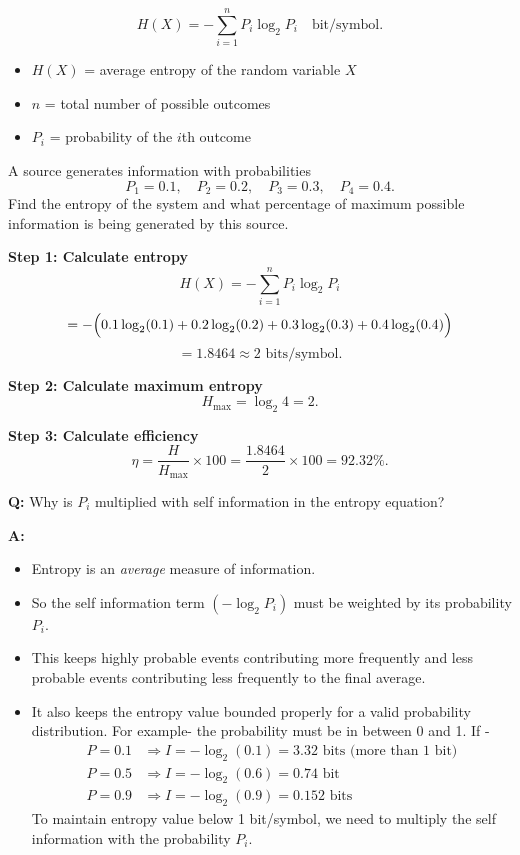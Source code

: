 \documentclass[11pt,a4paper]{book}
\newenvironment{formulabox}[1][Formula]{%
    \begin{tcolorbox}[
        enhanced,
        breakable,
        colback=softcoral!10,
        colframe=softcoral!200,
        title=#1,
        fonttitle=\bfseries,
        coltitle=white,
        sharp corners,
        boxrule=1pt,
        left=8pt,
        right=8pt,
        top=6pt,
        bottom=6pt
    ]
}{\end{tcolorbox}}
\newcounter{qna}[chapter]
\renewcommand{\theqna}{\thechapter.\arabic{qna}}
\newenvironment{questionanswerbox}[1][Example]{%
    \refstepcounter{qna}
    \begin{tcolorbox}[
        enhanced,
        breakable,
        colback=softlavender!10,
        colframe=softlavender!200,
        title={#1~\theqna},
        fonttitle=\bfseries,
        coltitle=white,
        colbacktitle=softlavender!200,
        sharp corners,
        boxrule=1pt,
        left=8pt,
        right=8pt,
        top=6pt,
        bottom=6pt
    ]
}{\end{tcolorbox}}
\begin{document}
\begin{formulabox}[Entropy of a Random Variable]
\[
H(X) = -\sum_{i=1}^{n} P_i \log_2 P_i
\quad \text{bit/symbol.}
\]
\begin{itemize}
    \item $H(X)$ = average entropy of the random variable $X$
    \item $n$ = total number of possible outcomes
    \item $P_i$ = probability of the $i$th outcome
\end{itemize}
\end{formulabox}

\begin{questionanswerbox}[Example]
A source generates information with probabilities
\[
P_1 = 0.1,\quad P_2 = 0.2,\quad P_3 = 0.3,\quad P_4 = 0.4.
\]
Find the entropy of the system and what percentage of maximum possible information is being generated by this source.

\textbf{Step 1: Calculate entropy}
\[
H(X) = -\sum_{i=1}^{n} P_i \log_2 P_i
\]
\[
= -\Bigl(0.1\log_2(0.1) + 0.2\log_2(0.2) + 0.3\log_2(0.3) + 0.4\log_2(0.4)\Bigr)
\]
\[
= 1.8464 \approx 2 \text{ bits/symbol.}
\]

\textbf{Step 2: Calculate maximum entropy}
\[
H_{\max} = \log_2 4 = 2.
\]

\textbf{Step 3: Calculate efficiency}
\[
\eta = \frac{H}{H_{\max}} \times 100
= \frac{1.8464}{2}\times 100
= 92.32\%.
\]
\end{questionanswerbox}

\begin{questionanswerbox}[Question]
\textbf{Q:} Why is \texorpdfstring{$P_i$}{Pi} multiplied with self information in the entropy equation?

\textbf{A:}
\begin{itemize}
    \item Entropy is an \emph{average} measure of information.
    \item So the self information term $\left(-\log_2 P_i\right)$ must be weighted by its probability $P_i$.
    \item This keeps highly probable events contributing more frequently and less probable events contributing less frequently to the final average.
    \item It also keeps the entropy value bounded properly for a valid probability distribution.
            For example- the probability must be in between 0 and 1. If - 
            \begin{align*}
                P = 0.1 &\Rightarrow I = -\log_2(0.1) = 3.32 \text{ bits} \text{ (more than 1 bit)} \\
                P = 0.5 &\Rightarrow I = -\log_2(0.6) = 0.74 \text{ bit} \\
                P = 0.9 &\Rightarrow I = -\log_2(0.9) = 0.152 \text{ bits}
            \end{align*}
            To maintain entropy value below 1 bit/symbol, we need to multiply the self information with the probability $P_i$.
\end{itemize}
\end{questionanswerbox}
\end{document}
